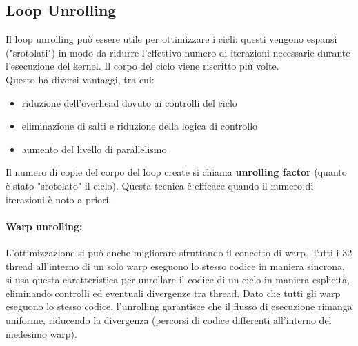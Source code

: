 \newpage

\subsection{Loop Unrolling}
Il loop unrolling può essere utile per ottimizzare i cicli: questi vengono espansi ("srotolati") in modo da ridurre l'effettivo numero di iterazioni necessarie durante l'esecuzione del kernel. Il corpo del ciclo viene riscritto più volte. \\

Questo ha diversi vantaggi, tra cui: 
\begin{itemize}
	\item riduzione dell'overhead dovuto ai controlli del ciclo
	\item eliminazione di salti e riduzione della logica di controllo 
	\item aumento del livello di parallelismo
\end{itemize}

Il numero di copie del corpo del loop create si chiama \textbf{unrolling factor} (quanto è stato "srotolato" il ciclo). Questa tecnica è efficace quando il numero di iterazioni è noto a priori.\\

\paragraph{Warp unrolling:} L'ottimizzazione si può anche migliorare sfruttando il concetto di warp. Tutti i 32 thread all'interno di un solo warp eseguono lo stesso codice in maniera sincrona, si usa questa caratteristica per unrollare il codice di un ciclo in maniera esplicita, eliminando controlli ed eventuali divergenze tra thread. Dato che tutti gli warp eseguono lo stesso codice, l'unrolling garantisce che il flusso di esecuzione rimanga uniforme, riducendo la divergenza (percorsi di codice differenti all'interno del medesimo warp). \\


